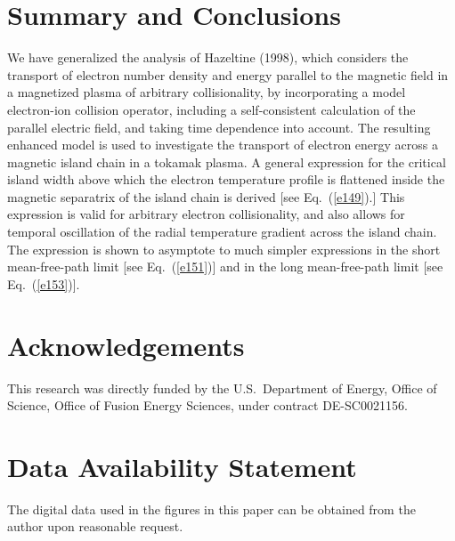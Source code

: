 \documentclass[12pt,prb,aps]{revtex4-1}
\begin{document}
\section{Summary and Conclusions}
We have generalized the analysis of Hazeltine (1998), which considers the transport of electron number density and energy parallel to the magnetic
field in a magnetized plasma of arbitrary collisionality,  by  incorporating a model electron-ion collision operator,
 including a self-consistent calculation of the parallel electric field, and taking time dependence into account. The resulting enhanced model is
 used to investigate the transport of electron energy across a magnetic island chain in a tokamak plasma. A general expression for the critical
 island width above which the electron temperature profile is flattened inside the magnetic separatrix of the island chain is derived [see Eq.~(\ref{e149}).]
 This expression is valid for arbitrary electron collisionality, and also allows for temporal oscillation of the radial temperature gradient across the island chain. 
 The expression is shown to asymptote to much simpler expressions in the short mean-free-path limit [see Eq.~(\ref{e151})] and in the long mean-free-path limit [see
 Eq.~(\ref{e153})]. 
 
\section*{Acknowledgements}
This research was directly funded by the U.S.\ Department of Energy, Office of Science, Office of Fusion Energy Sciences, under  contract DE-SC0021156. 

\section*{Data Availability Statement}
The digital data used in the figures in this paper can be obtained from the author upon reasonable request.
\end{document}
